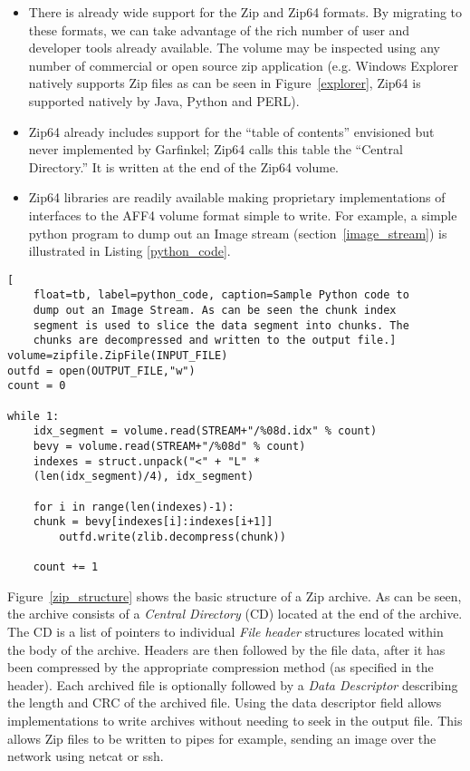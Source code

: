 \documentclass[10pt, conference]{IEEEtran}
\begin{document}
\begin{itemize}
\item There is already wide support for the Zip and Zip64 formats. By
  migrating to these formats, we can take advantage of the rich number
  of user and developer tools already available. The volume may be
  inspected using any number of commercial or open source zip
  application (e.g. Windows Explorer natively supports Zip files as
  can be seen in Figure~\ref{explorer}, Zip64 is supported natively
  by Java, Python and PERL).
 
\item Zip64 already includes support for the ``table of contents''
  envisioned but never implemented by Garfinkel; Zip64 calls this
  table the ``Central Directory.'' It is written at the end of the
  Zip64 volume.

\item Zip64 libraries are readily available making proprietary implementations of
  interfaces to the AFF4 volume format simple to write. For example, a
  simple python program to dump out an Image stream
  (section~\ref{image_stream}) is illustrated in Listing
  \ref{python_code}.

\end{itemize}

\begin{lstlisting}[
	float=tb, label=python_code, caption=Sample Python code to
	dump out an Image Stream. As can be seen the chunk index
	segment is used to slice the data segment into chunks. The
	chunks are decompressed and written to the output file.]
volume=zipfile.ZipFile(INPUT_FILE)
outfd = open(OUTPUT_FILE,"w")
count = 0

while 1:
    idx_segment = volume.read(STREAM+"/%08d.idx" % count)
    bevy = volume.read(STREAM+"/%08d" % count)
    indexes = struct.unpack("<" + "L" * 
	(len(idx_segment)/4), idx_segment)

    for i in range(len(indexes)-1):
	chunk = bevy[indexes[i]:indexes[i+1]]
        outfd.write(zlib.decompress(chunk))

    count += 1
\end{lstlisting}

Figure~\ref{zip_structure} shows the basic structure of a Zip
archive. As can be seen, the archive consists of a {\em Central Directory} (CD)
located at the end of the archive. The CD is a list of pointers to
individual {\em File header} structures located within the body of the
archive. Headers are then followed by the file data, after it has been
compressed by the appropriate compression method (as specified in the
header). Each archived file is optionally followed by a {\em Data
Descriptor} describing the length and CRC of the archived file. Using
the data descriptor field allows implementations to write archives
without needing to seek in the output file. This allows Zip files to
be written to pipes for example, sending an image over the network
using netcat or ssh.
\end{document}
